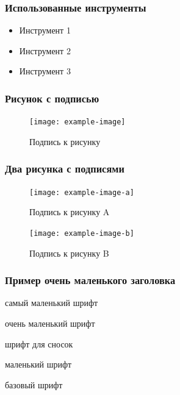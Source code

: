 \documentclass{beamer}
\begin{document}
{%
\begin{frame}
    \frametitle{Использованные инструменты}
    \begin{itemize}
        \item Инструмент 1
        \item Инструмент 2
        \item Инструмент 3
    \end{itemize}
\end{frame}


\begin{frame}
    \frametitle{Рисунок с подписью}
    \vspace{15mm} %
    \begin{figure}
        \texttt{[image: example-image]}
        \caption{Подпись к рисунку}
    \end{figure}
\end{frame}


\begin{frame}
    \frametitle{Два рисунка с подписями}
    \vspace{15mm} %
    \begin{figure}
        \centering
        \begin{minipage}[b]{0.45\textwidth}
            \texttt{[image: example-image-a]}
            \caption{Подпись к рисунку A}
        \end{minipage}
        \hfill
        \begin{minipage}[b]{0.45\textwidth}
            \texttt{[image: example-image-b]}
            \caption{Подпись к рисунку B}
        \end{minipage}
    \end{figure}
\end{frame}


\begin{frame}
    \frametitle{\scriptsize Пример очень маленького заголовка}
    \vspace{5mm}
    
    \tiny самый маленький шрифт
    
    \scriptsize очень маленький шрифт
    
    \footnotesize шрифт для сносок
    
    \small маленький шрифт
    
    \normalsize базовый шрифт
    

\end{frame}}
\end{document}
